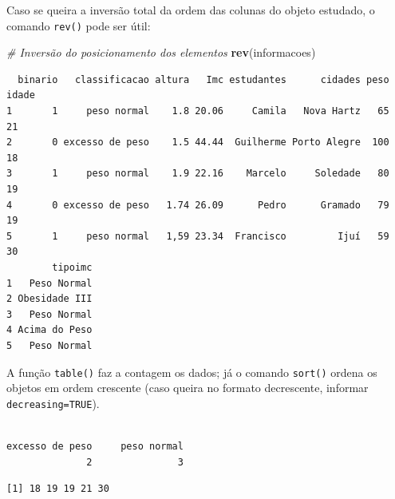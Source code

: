 \documentclass[12pt,brazil,oneside]{book}
\newenvironment{Shaded}{\begin{snugshade}}{\end{snugshade}}
\newcommand{\CommentTok}[1]{\textcolor[rgb]{0.56,0.35,0.01}{\textit{#1}}}
\newcommand{\KeywordTok}[1]{\textcolor[rgb]{0.13,0.29,0.53}{\textbf{#1}}}
\newcommand{\NormalTok}[1]{#1}
\newcommand{\OperatorTok}[1]{\textcolor[rgb]{0.81,0.36,0.00}{\textbf{#1}}}
\begin{document}
Caso se queira a inversão total da ordem das colunas do objeto estudado,
o comando \texttt{rev()} pode ser útil:

\begin{Shaded}
\begin{Highlighting}[]
\CommentTok{# Inversão do posicionamento dos elementos}
\KeywordTok{rev}\NormalTok{(informacoes)}
\end{Highlighting}
\end{Shaded}

\begin{verbatim}
  binario   classificacao altura   Imc estudantes      cidades peso idade
1       1     peso normal    1.8 20.06     Camila   Nova Hartz   65    21
2       0 excesso de peso    1.5 44.44  Guilherme Porto Alegre  100    18
3       1     peso normal    1.9 22.16    Marcelo     Soledade   80    19
4       0 excesso de peso   1.74 26.09      Pedro      Gramado   79    19
5       1     peso normal   1,59 23.34  Francisco         Ijuí   59    30
        tipoimc
1   Peso Normal
2 Obesidade III
3   Peso Normal
4 Acima do Peso
5   Peso Normal
\end{verbatim}

A função \texttt{table()} faz a contagem os dados; já o comando
\texttt{sort()} ordena os objetos em ordem crescente (caso queira no
formato decrescente, informar \texttt{decreasing=TRUE}).

\begin{Shaded}
\end{Shaded}

\begin{verbatim}

excesso de peso     peso normal 
              2               3 
\end{verbatim}

\begin{Shaded}
\end{Shaded}

\begin{verbatim}
[1] 18 19 19 21 30
\end{verbatim}
\end{document}
